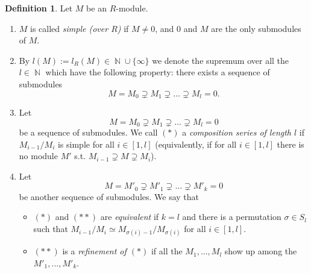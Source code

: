\documentclass[12pt,a4paper]{report}
\theoremstyle{definition}
\newtheorem{defn}[theorem]{Definition}
\theoremstyle{num.custom-title}
\DeclareMathOperator{\N}{\mathbb{N}}
\begin{document}
\begin{defn}
Let $M$ be an $R$-module.
\begin{enumerate}
\item $M$ is called \emph{simple (over $R$)} if $M \neq 0$, and $0$ and $M$ are the only submodules of $M$.
\item By $l(M) := l_R(M) \in \N \cup \{\infty\}$ we denote the supremum over all the $l \in \N$ which have the following property: there exists a sequence of submodules
\[
M = M_0 \supsetneq M_1 \supsetneq \ldots \supsetneq M_l =0.
\]
\item Let
\[
M = M_0 \supsetneq M_1 \supsetneq \ldots \supsetneq M_l =0 \tag{$*$}
\]
be a sequence of submodules. We call $(*)$ a \emph{composition series of length $l$} if $M_{i-1}/M_i$ is simple for all $i \in [1,l]$ (equivalently, if for all $i \in [1,l]$ there is no module $M'$ s.t. $M_{i-1} \supsetneq M \supsetneq M_i$).
\item Let
\[
M = M'_0 \supsetneq M'_1 \supsetneq \ldots \supsetneq M'_k =0 \tag{$**$}
\]
be another sequence of submodules. We say that 
\begin{itemize}
\item $(*)$ and $(**)$ are \emph{equivalent} if $k=l$ and there is a permutation $\sigma \in S_l$ such that $M_{i-1}/M_i \simeq M_{\sigma(i)-1}/M_{\sigma(i)}$ for all $i \in [1,l]$.
\item $(**)$ is a \emph{refinement of $(*)$} if all the $M_1,...,M_l$ show up among the $M'_1,...,M'_k$.
\end{itemize}
\end{enumerate}
\end{defn}
\end{document}
